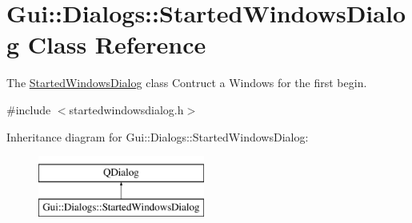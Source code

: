 \hypertarget{classGui_1_1Dialogs_1_1StartedWindowsDialog}{}\section{Gui\+:\+:Dialogs\+:\+:Started\+Windows\+Dialog Class Reference}
\label{classGui_1_1Dialogs_1_1StartedWindowsDialog}


The \hyperlink{classGui_1_1Dialogs_1_1StartedWindowsDialog}{Started\+Windows\+Dialog} class Contruct a Windows for the first begin.  




{\ttfamily \#include $<$startedwindowsdialog.\+h$>$}

Inheritance diagram for Gui\+:\+:Dialogs\+:\+:Started\+Windows\+Dialog\+:\begin{figure}[H]
\begin{center}
\leavevmode
\includegraphics[height=2.000000cm]{de/de1/classGui_1_1Dialogs_1_1StartedWindowsDialog}
\end{center}
\end{figure}
